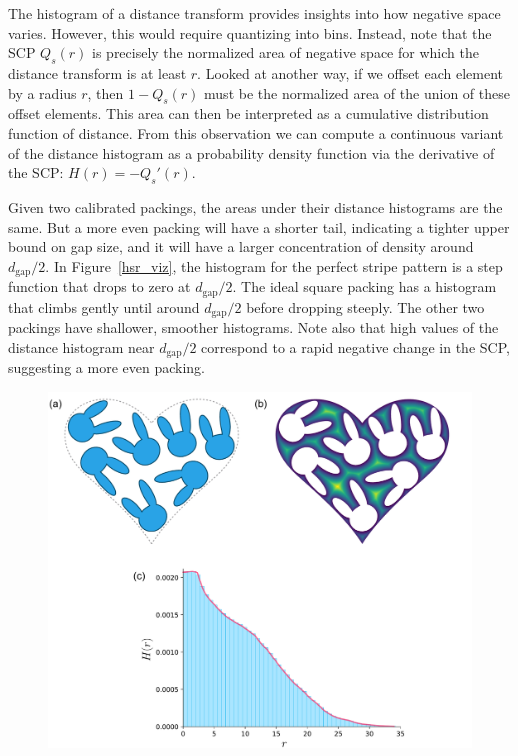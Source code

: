 The histogram of a distance transform provides insights into how negative space varies. 
However, this would require quantizing  into bins.
Instead, note that the SCP $Q_s(r)$ is precisely the normalized area of 
negative space for which the distance transform is at least $r$. 
Looked at another way, if we offset each element by a
radius $r$, then $1-Q_s(r)$ must be the normalized 
area of the union of these offset elements.
This area can then be interpreted as 
a cumulative distribution function of distance.  From this observation
we can compute a continuous variant of the distance histogram as a 
probability density function via the derivative of the SCP: $H(r)=-Q_s'(r)$.


Given two calibrated packings, the areas under their distance histograms
are the same.  But a more even packing will have a shorter tail,
indicating a tighter upper bound on gap size, and it will have a larger
concentration of density around $d_\mathrm{gap}/2$.  In Figure~\ref{hsr_viz},
the histogram for the perfect stripe pattern is a step function that drops
to zero at $d_\mathrm{gap}/2$.  The ideal square packing has a histogram
that climbs gently until around $d_\mathrm{gap}/2$ before dropping
steeply.  The other two packings have shallower, smoother histograms.
Note also that high values of the distance histogram near $d_\mathrm{gap}/2$
correspond to a rapid negative change in the SCP, suggesting a more even
packing.

\begin{figure}
\centering
\includegraphics[width=1.0\textwidth]{figures/metrics/rabbit.pdf}
\caption[An example of distance transform of negative space]
{\label{fig_distance_transform}
}
\end{figure}

